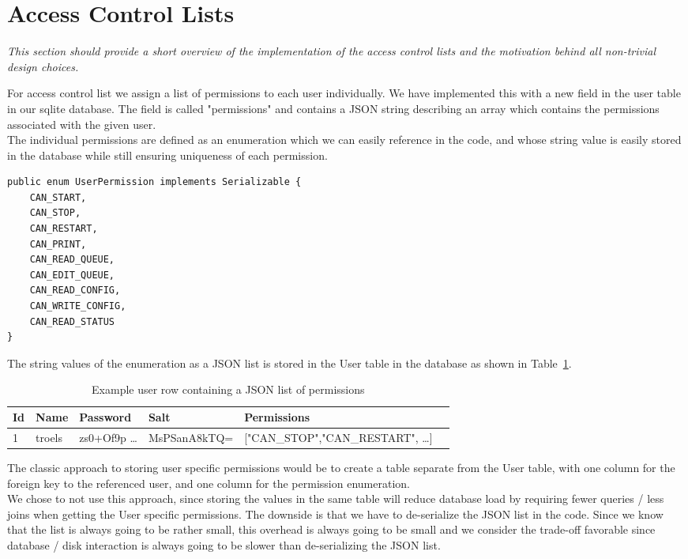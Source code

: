 \documentclass[12pt]{article}
\begin{document}
\newpage

\section{Access Control Lists}
\label{sec:Access Control Lists}

\textit{This section should provide a short overview of the implementation of the access control lists and the motivation behind all non-trivial design choices.}

For access control list we assign a list of permissions to each user individually. We have implemented this with a new field in the user table in our sqlite database. The field is called "permissions" and contains a JSON string describing an array which contains the permissions associated with the given user. \\
The individual permissions are defined as an enumeration which we can easily reference in the code, and whose string value is easily stored in the database while still ensuring uniqueness of each permission.

\begin{lstlisting}[caption=UserPermission enumerating the possible permissions on the server.]
public enum UserPermission implements Serializable {
    CAN_START,
    CAN_STOP,
    CAN_RESTART,
    CAN_PRINT,
    CAN_READ_QUEUE,
    CAN_EDIT_QUEUE,
    CAN_READ_CONFIG,
    CAN_WRITE_CONFIG,
    CAN_READ_STATUS
}
\end{lstlisting}

The string values of the enumeration as a JSON list is stored in the User table in the database as shown in Table~\ref{json-permissions}.

\begin{table}[H]
\centering
\begin{tabular}{|l|l|l|l|l|l|}
\hline
Id & Name & Password & Salt & Permissions \\
\hline
1 & troels & zs0+Of9p \ldots & MsPSanA8kTQ= & ["CAN\_STOP","CAN\_RESTART", \ldots] \\
\hline
\end{tabular}
\caption{Example user row containing a JSON list of permissions}
\label{json-permissions}
\end{table}

The classic approach to storing user specific permissions would be to create a table separate from the User table, with one column for the foreign key to the referenced user, and one column for the permission enumeration. \\
We chose to not use this approach, since storing the values in the same table will reduce database load by requiring fewer queries / less joins when getting the User specific permissions. The downside is that we have to de-serialize the JSON list in the code. Since we know that the list is always going to be rather small, this overhead is always going to be small and we consider the trade-off favorable since database / disk interaction is always going to be slower than de-serializing the JSON list.
\end{document}
